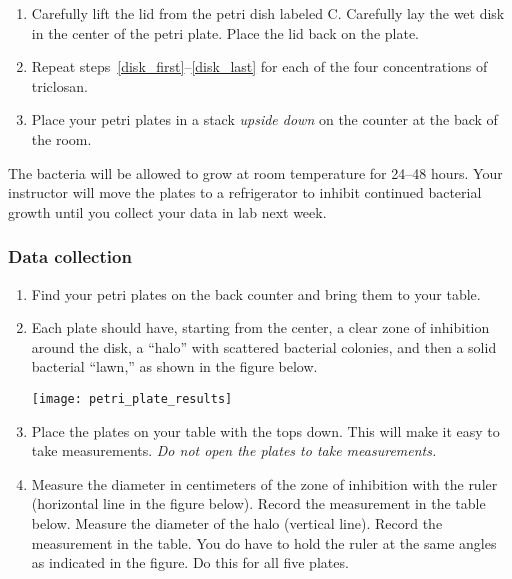 \documentclass[12pt]{exam}
\begin{document}
\begin{questions}
\begin{enumerate}
		\item \label{disk_last} Carefully lift the lid from the petri dish labeled C. Carefully lay the wet disk in the center of the petri plate. Place the lid back on the plate.


		\item Repeat steps~\ref{disk_first}–\ref{disk_last} for each of the four concentrations of triclosan.
		
		\item Place your petri plates in a stack \emph{upside down} on the counter at the back of the room.
		
	\end{enumerate}

The bacteria will be allowed to grow at room temperature for 24–48 hours. Your instructor will move the plates to a refrigerator to inhibit continued bacterial growth until you collect your data in lab next week.

\subsubsection*{Data collection}

\begin{enumerate}

	\item Find your petri plates on the back counter and bring them to your table.
	
	\item Each plate should have, starting from the center, a clear zone of inhibition around the disk, a “halo” with scattered bacterial colonies, and then a solid bacterial “lawn,” as shown in the figure below.
	
		{\centering\texttt{[image: petri\_plate\_results]}\par
		}

	\item Place the plates on your table with the tops down. This will make it easy to take measurements. \emph{Do not open the plates to take measurements.}
	
	\item Measure the diameter in centimeters of the zone of inhibition with the ruler (horizontal line in the figure below). Record the measurement in the table below. Measure the diameter of the halo (vertical line). Record the measurement in the table. You do have to hold the ruler at the same angles as indicated in the figure. Do this for all five plates.


\end{enumerate}
\end{questions}
\end{document}
